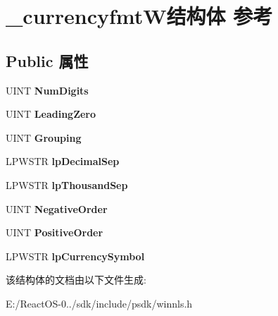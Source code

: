 \hypertarget{struct__currencyfmt_w}{}\section{\+\_\+currencyfmt\+W结构体 参考}
\label{struct__currencyfmt_w}
\subsection*{Public 属性}
\begin{DoxyCompactItemize}
\item 
\mbox{\label{struct__currencyfmt_w_a94425cc738b084172d02bdb3b76c77ba}} 
U\+I\+NT {\bfseries Num\+Digits}
\item 
\mbox{\label{struct__currencyfmt_w_a35be850502a070274413cafc9a746ae8}} 
U\+I\+NT {\bfseries Leading\+Zero}
\item 
\mbox{\label{struct__currencyfmt_w_ac9dd09da98c3a6ed7d891f19b4a9b436}} 
U\+I\+NT {\bfseries Grouping}
\item 
\mbox{\label{struct__currencyfmt_w_a4a90d4fec3cdb00e5bac831a2e999c6c}} 
L\+P\+W\+S\+TR {\bfseries lp\+Decimal\+Sep}
\item 
\mbox{\label{struct__currencyfmt_w_ad0fa4647ef7e2db9fb32e9c2f9dc7992}} 
L\+P\+W\+S\+TR {\bfseries lp\+Thousand\+Sep}
\item 
\mbox{\label{struct__currencyfmt_w_ace95de0115a1a51cf4cc6890ad934edf}} 
U\+I\+NT {\bfseries Negative\+Order}
\item 
\mbox{\label{struct__currencyfmt_w_abc66619846c54c609676b676bd908a56}} 
U\+I\+NT {\bfseries Positive\+Order}
\item 
\mbox{\label{struct__currencyfmt_w_ab6d6d285b65677b5c466d3db47b36b76}} 
L\+P\+W\+S\+TR {\bfseries lp\+Currency\+Symbol}
\end{DoxyCompactItemize}


该结构体的文档由以下文件生成\+:\begin{DoxyCompactItemize}
\item 
E\+:/\+React\+O\+S-\/0../sdk/include/psdk/winnls.\+h\end{DoxyCompactItemize}
